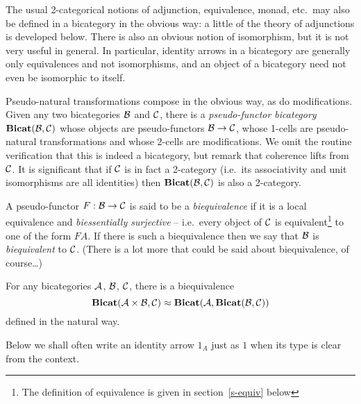 The usual 2-categorical notions of adjunction, equivalence, monad, etc.\ may
also be defined in a bicategory in the obvious way: a little of the theory of adjunctions
is developed below. There is also an obvious
notion of isomorphism, but it is not very useful in general. In particular, identity
arrows in a bicategory are generally only equivalences and not isomorphisms,
and an object of a bicategory need not even be isomorphic to itself.

Pseudo-natural transformations compose in the obvious way, as do modifications.
Given any two bicategories $\mathcal{B}$ and $\mathcal{C}$, there is a \emph{pseudo-functor bicategory}
$\mathbf{Bicat}(\mathcal{B},\mathcal{C})$ whose objects are pseudo-functors $\mathcal{B}\to\mathcal{C}$,
whose 1-cells are pseudo-natural transformations and whose
2-cells are modifications. We omit the routine verification that
this is indeed a bicategory, but remark that coherence lifts from
$\mathcal{C}$. It is significant that if $\mathcal{C}$ is in fact a 2-category
(i.e.\ its associativity and unit isomorphisms are all identities) then
$\mathbf{Bicat}(\mathcal{B},\mathcal{C})$ is also a 2-category.

A pseudo-functor $F:\mathcal{B}\to\mathcal{C}$ is said to be a \emph{biequivalence}
if it is a local equivalence and \emph{biessentially surjective} -- i.e.\ every
object of $\mathcal{C}$ is equivalent\footnote{The definition of equivalence is given in section~\ref{s-equiv} below}
to one of the form $FA$. If there is such a
biequivalence then we say that $\mathcal{B}$ is \emph{biequivalent} to $\mathcal{C}$.
(There is a lot more that could be said about biequivalence, of course\dots)

For any bicategories $\mathcal{A}$, $\mathcal{B}$, $\mathcal{C}$, there is a biequivalence
\[
	\mathbf{Bicat}(\mathcal{A}\times\mathcal{B}, \mathcal{C}) \approx \mathbf{Bicat}(\mathcal{A}, \mathbf{Bicat}(\mathcal{B},\mathcal{C}))
\]
defined in the natural way.
% 

Below we shall often write
an identity arrow $1_A$ just as $1$ when its type is clear from the context.

